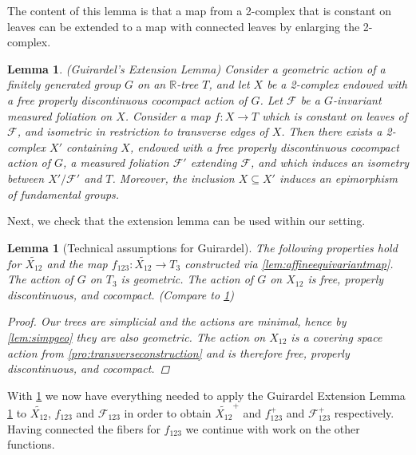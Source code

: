 \documentclass[12pt,parskip=full]{report}
\theoremstyle{plain}
\newtheorem{lem}[thm]{Lemma}
\theoremstyle{definition}
\begin{document}
        The content of this lemma is that a map from a 2-complex that is constant on leaves can be extended to a map with connected leaves by enlarging the 2-complex.
        \begin{lem}
            \label{lem:guirardel-extension}
            (Guirardel's Extension Lemma)
            Consider a geometric action of a finitely generated group \(G\) on an \(\mathbb{R}\)-tree \(T\), and let \(X\) be a 2-complex endowed with a free properly discontinuous cocompact action of \(G\). Let \(\mathscr{F}\) be a \(G\)-invariant measured foliation on \(X\). Consider a map \(f: X \to T\) which is constant on leaves of \(\mathscr{F}\), and isometric in restriction to transverse edges of \(X\). Then there exists a 2-complex \( X'\) containing \(X\), endowed with a free properly discontinuous cocompact action of \(G\), a measured foliation \(\mathscr{F} '\) extending \(\mathscr{F}\), and which induces an isometry between \(X'/ \mathscr{F}'\) and \(T\). Moreover, the inclusion \(X \subseteq X'\) induces an epimorphism of fundamental groups.
        \end{lem}
        
        Next, we check that the extension lemma can be used within our setting.
\begin{lem}
[Technical assumptions for Guirardel]
    \label{lem:technicalconditions}
 The following properties hold for \(\widetilde{ X_{12} }\) and the map \(f_{123}: \widetilde{ X_{12}}\to T_3\) constructed via  \ref{lem:affineequivariantmap}. The action of \(G\) on \(T_3\) is geometric. The action of \(G\) on \(X_{12}\) is free, properly discontinuous, and cocompact. (Compare to \ref{lem:guirardel-extension})
    
    \begin{proof}
        Our trees are simplicial and the actions are minimal, hence by \ref{lem:simpgeo} they are also geometric. The action on \(X_{12}\) is a covering space action from \ref{pro:transverseconstruction} and is therefore free, properly discontinuous, and cocompact.
    \end{proof}
\end{lem}

        With \ref{lem:technicalconditions} we now have everything needed to apply the Guirardel Extension Lemma \ref{lem:guirardel-extension} to \(\widetilde{X_{12}}\), \(f_{123}\) and \(\mathscr{F}_{123}\) in order to obtain \(\widetilde{X_{12}}^{+}\) and \(f_{123}^{+}\) and \(\mathscr{F}_{123}^{+}\) respectively. Having connected the fibers for \(f_{123}\) we continue with  work on the other functions.
\end{document}
